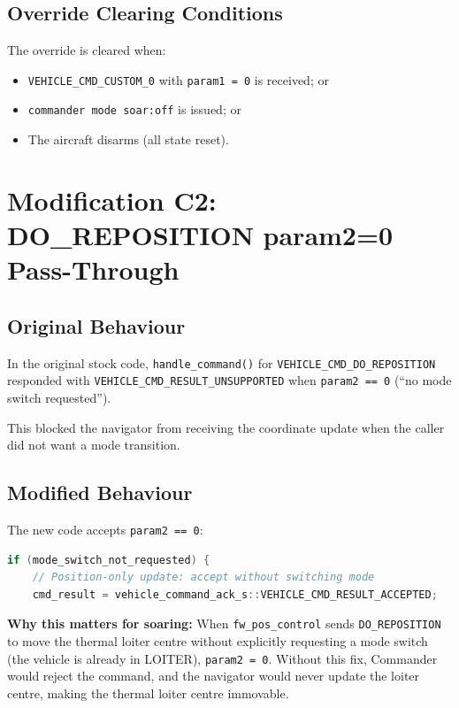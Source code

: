 \documentclass[12pt,a4paper]{article}
\begin{document}
\subsection{Override Clearing Conditions}

The override is cleared when:
\begin{itemize}
  \item \texttt{VEHICLE\_CMD\_CUSTOM\_0} with \texttt{param1 = 0} is received; or
  \item \texttt{commander mode soar:off} is issued; or
  \item The aircraft disarms (all state reset).
\end{itemize}

\section{Modification C2: DO\_REPOSITION param2=0 Pass-Through}

\subsection{Original Behaviour}

In the original stock code, \texttt{handle\_command()} for
\texttt{VEHICLE\_CMD\_DO\_REPOSITION} responded with
\texttt{VEHICLE\_CMD\_RESULT\_UNSUPPORTED} when \texttt{param2 == 0}
(``no mode switch requested'').

This blocked the navigator from receiving the coordinate update when the
caller did not want a mode transition.

\subsection{Modified Behaviour}

The new code accepts \texttt{param2 == 0}:

\begin{lstlisting}[language=C++]
if (mode_switch_not_requested) {
    // Position-only update: accept without switching mode
    cmd_result = vehicle_command_ack_s::VEHICLE_CMD_RESULT_ACCEPTED;
\end{lstlisting}

\textbf{Why this matters for soaring:}
When \texttt{fw\_pos\_control} sends \texttt{DO\_REPOSITION} to move the thermal
loiter centre without explicitly requesting a mode switch (the vehicle is already
in LOITER), \texttt{param2 = 0}.
Without this fix, Commander would reject the command, and the navigator would
never update the loiter centre, making the thermal loiter centre immovable.
\end{document}
